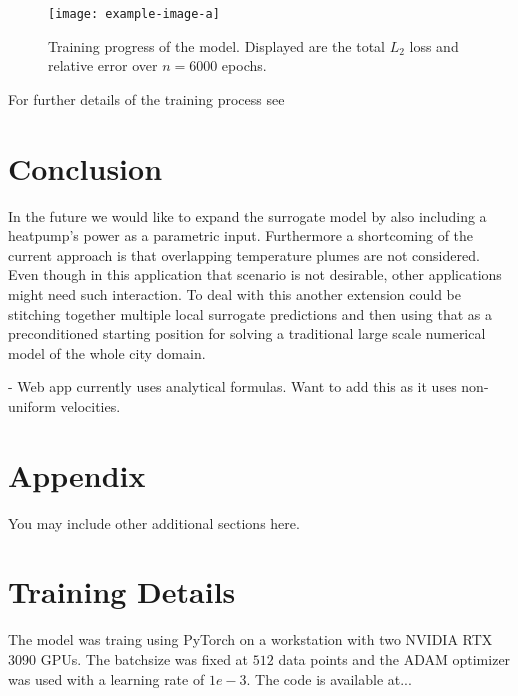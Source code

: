 \documentclass{article} %
\begin{document}
\begin{figure}[htb]
   \centering
   \texttt{[image: example-image-a]}
   \caption{Training progress of the model. Displayed are the total $L_2$ loss and relative error over $n=6000$ epochs.}
\end{figure}

For further details of the training process see 

\section{Conclusion}
\label{sec:conclusion}




In the future we would like to expand the surrogate model by also including a heatpump's power as a parametric input.
Furthermore a shortcoming of the current approach is that overlapping temperature plumes are not considered.
Even though in this application that scenario is not desirable, other applications might need such interaction.
To deal with this another extension could be stitching together multiple local surrogate predictions and then using that as a preconditioned starting position for solving a traditional large scale numerical model of the whole city domain.

- Web app currently uses analytical formulas. Want to add this as it uses non-uniform velocities.

%




\appendix
\section{Appendix}
You may include other additional sections here.

\section{Training Details}
The model was traing using PyTorch \citep{pytorch} on a workstation with two NVIDIA RTX 3090 GPUs. The batchsize was fixed at $512$ data points and the ADAM optimizer was used with a learning rate of $1e-3$.
The code is available at...
\end{document}
